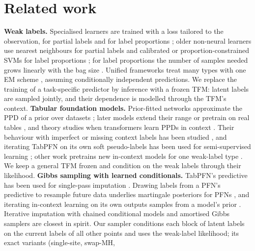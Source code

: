 \section{Related work}\label{sec:related}
\textbf{Weak labels.} Specialised learners are trained with a loss tailored to the observation, for partial labels
\citep{proden,feng2020provably,pico} and for label proportions \citep{dllp,easy_llp,tsai2020llpvat,bp_llp}; older non-neural learners use nearest neighbours for partial
labels \citep{hullermeier2006plknn,zhang2015ipal} and calibrated or proportion-constrained SVMs for label proportions
\citep{ruping2010invcal,yu2013propsvm}; for label
proportions the number of samples needed grows linearly with the bag size \citep{busafekete2025llp}. Unified frameworks treat many types with one
EM scheme \citep{glws,ill,count_wsl}, assuming conditionally independent predictions. We replace
the training of a task-specific predictor by inference with a frozen TFM: latent labels are sampled jointly, and their
dependence is modelled through the TFM's context.
\textbf{Tabular foundation models.} Prior-fitted networks approximate the PPD of a prior over datasets
\citep{muller2022pfn}; later models extend their range \citep{tabpfn3} or pretrain on real tables \citep{tabdpt}, and
theory studies when transformers learn PPDs in context \citep{ppd_icl_theory}. Their behaviour with imperfect or
missing context labels has been studied \citep{noise_immunity,unlabeled_icl_theory}, and iterating TabPFN on its own soft
pseudo-labels has been used for semi-supervised learning \citep{unlabeled_icl_theory}; other work pretrains new in-context
models for one weak-label type \citep{inctx_pu,ic_ssl,icmil}. We keep a general TFM frozen and condition on the weak
labels through their likelihood.
\textbf{Gibbs sampling with learned conditionals.} TabPFN's predictive has been used for single-pass imputation
\citep{sepin_mi,tabimpute}. Drawing labels from a PFN's predictive to resample future data underlies martingale
posteriors for PFNs \citep{nagler2025martingale,ng2025tabmgp}, and iterating in-context learning on its own outputs
samples from a model's prior \citep{zhu2024iterated}. Iterative imputation with chained conditional models \citep{liu2014}
and amortised Gibbs samplers \citep{apgs} are closest in spirit. Our sampler conditions each block of latent labels on
the current labels of all other points and uses the weak-label likelihood; its exact variants (single-site, swap-MH,
